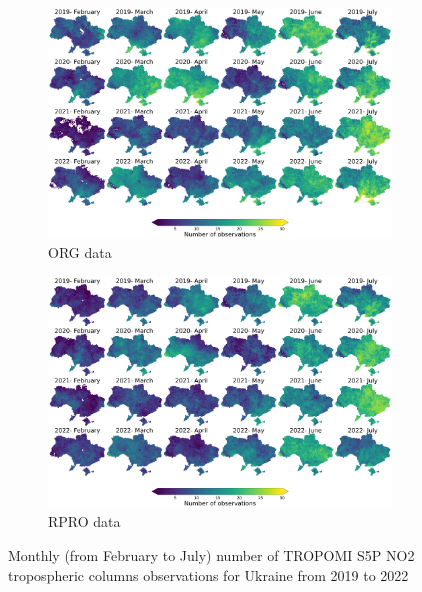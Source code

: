 \begin{figure}[p]
    \centering
    \begin{subfigure}{\textwidth}
      \centering
      \includegraphics[width=\textwidth]{figs/chap3/fig2_a.png}
      \caption{ORG data}
    \label{fig:chap3_fig2a}
    \end{subfigure}

    \begin{subfigure}{\textwidth}
      \centering
      \includegraphics[width=\textwidth]{figs/chap3/fig2_b.png}
      \caption{RPRO data}
      \label{fig:chap3_fig2b}
    \end{subfigure}
    \caption[Monthly number of qualitfied S5P NO2 observations in Ukraine]{Monthly (from February to July) number of TROPOMI S5P NO2 tropospheric columns observations for Ukraine from 2019 to 2022}
    \label{fig:chap3_fig2}
\end{figure}

